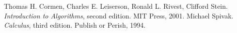 \documentclass[12pt]{article}
\begin{document}
\begin{thebibliography}{3}
Thomas H. Cormen, Charles E. Leiserson, Ronald L. Rivest, Clifford Stein.
{\it Introduction to Algorithms}, second edition. MIT Press, 2001.
Michael Spivak. {\it Calculus}, third edition. Publish or Perish, 1994.
\end{thebibliography}

\end{document}
